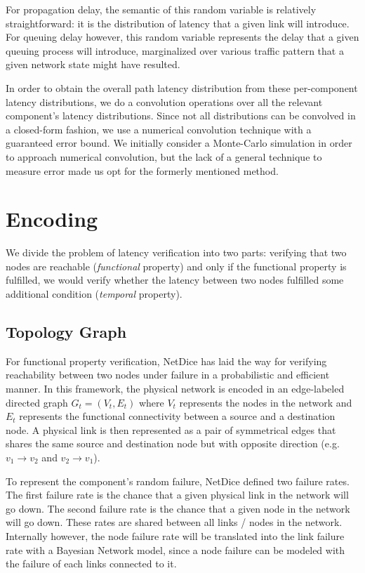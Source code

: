 \documentclass[10pt,sigconf,letterpaper,anonymous,nonacm]{acmart}
\begin{document}
For propagation delay, the semantic of this random variable is relatively straightforward: it is 
the distribution of latency that a given link will introduce.
For queuing delay however, this random variable represents the delay that a given queuing process 
will introduce, marginalized over various traffic pattern that a given network state might have 
resulted.

In order to obtain the overall path latency distribution from these per-component latency 
distributions, we do a convolution operations over all the relevant component's latency 
distributions.
Since not all distributions can be convolved in a closed-form fashion, we use a numerical 
convolution technique with a guaranteed error bound. 
We initially consider a Monte-Carlo simulation in order to approach numerical convolution, but 
the lack of a general technique to measure error made us opt for the formerly mentioned method.


\section{Encoding}
We divide the problem of latency verification into two parts: 
verifying that two nodes are reachable (\textit{functional} property) and only if 
the functional property is fulfilled, we would verify whether the latency between 
two nodes fulfilled some additional condition (\textit{temporal} property).

\subsection{Topology Graph}
For functional property verification, NetDice \cite{steffen2020probabilistic} 
has laid the way for verifying reachability between two nodes under failure in a 
probabilistic and efficient manner. 
In this framework, the physical network is encoded in an edge-labeled directed graph 
$G_t = (V_t, E_t)$ where $V_t$ represents the nodes in the network and 
$E_t$ represents the functional connectivity between a source and a destination node. 
A physical link is then represented as a pair of symmetrical edges that shares the same source 
and destination node but with opposite direction (e.g. $v_1 \rightarrow v_2$ and $v_2 
\rightarrow v_1$).

To represent the component's random failure, NetDice defined two failure rates.
The first failure rate is the chance that a given physical link in the network will go down.
The second failure rate is the chance that a given node in the network will go down.
These rates are shared between all links / nodes in the network.
Internally however, the node failure rate will be translated into the link failure rate 
with a Bayesian Network model, since a node failure can be modeled with the failure of each 
links connected to it.
\end{document}
